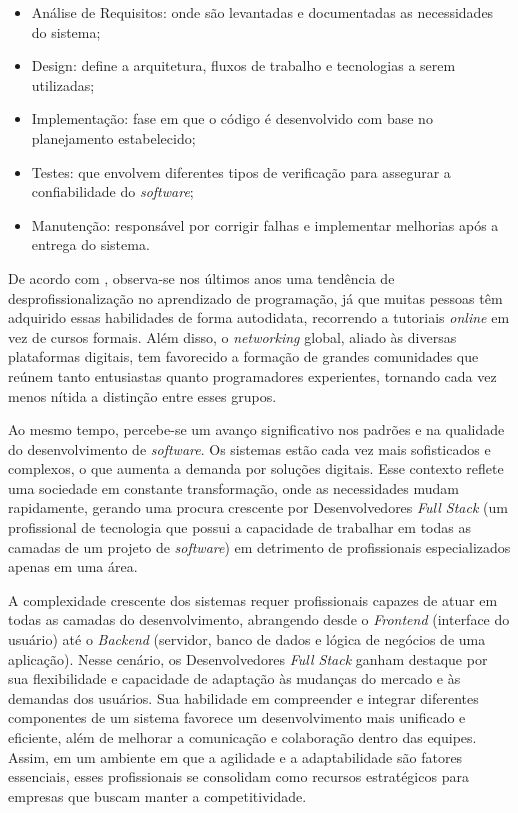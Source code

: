 \documentclass[english,brazilian]{UNISINOSartigo} %
\begin{document}
\begin{itemize}[leftmargin=1cm, itemsep=0.1em, topsep=0.1em]
    \item Análise de Requisitos: onde são levantadas e documentadas as necessidades do sistema;
    \item Design: define a arquitetura, fluxos de trabalho e tecnologias a serem utilizadas;
    \item Implementação: fase em que o código é desenvolvido com base no planejamento estabelecido;
    \item Testes: que envolvem diferentes tipos de verificação para assegurar a confiabilidade do \textit{software};
    \item Manutenção: responsável por corrigir falhas e implementar melhorias após a entrega do sistema. 
\end{itemize}

De acordo com , observa-se nos últimos anos uma tendência de desprofissionalização no aprendizado de programação, já que muitas pessoas têm adquirido essas habilidades de forma autodidata, recorrendo a tutoriais \textit{online} em vez de cursos formais. Além disso, o \textit{networking} global, aliado às diversas plataformas digitais, tem favorecido a formação de grandes comunidades que reúnem tanto entusiastas quanto programadores experientes, tornando cada vez menos nítida a distinção entre esses grupos.

Ao mesmo tempo, percebe-se um avanço significativo nos padrões e na qualidade do desenvolvimento de \textit{software}. Os sistemas estão cada vez mais sofisticados e complexos, o que aumenta a demanda por soluções digitais. Esse contexto reflete uma sociedade em constante transformação, onde as necessidades mudam rapidamente, gerando uma procura crescente por Desenvolvedores \textit{Full Stack} (um profissional de tecnologia que possui a capacidade de trabalhar em todas as camadas de um projeto de \textit{software}) em detrimento de profissionais especializados apenas em uma área.

A complexidade crescente dos sistemas requer profissionais capazes de atuar em todas as camadas do desenvolvimento, abrangendo desde o \textit{Frontend} (interface do usuário) até o \textit{Backend} (servidor, banco de dados e lógica de negócios de uma aplicação). Nesse cenário, os Desenvolvedores \textit{Full Stack} ganham destaque por sua flexibilidade e capacidade de adaptação às mudanças do mercado e às demandas dos usuários. Sua habilidade em compreender e integrar diferentes componentes de um sistema favorece um desenvolvimento mais unificado e eficiente, além de melhorar a comunicação e colaboração dentro das equipes. Assim, em um ambiente em que a agilidade e a adaptabilidade são fatores essenciais, esses profissionais se consolidam como recursos estratégicos para empresas que buscam manter a competitividade.
\end{document}
